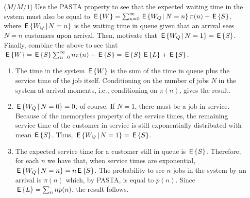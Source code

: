 \begin{comment}
\begin{exercise}[use=false]
  As a challenge you can try to derive \eqref{eq:24} by means of sample path arguments.
  \begin{solution}
    \TBD
  \end{solution}
\end{exercise}
\end{comment}




\begin{exercise}($M/M/1$)
  Use the PASTA property to see that the expected waiting time in the
  system must also be equal to
  $\,\mathsf{E}\left\{W\right\} = \sum_{n=0}^\infty \,\mathsf{E}\left\{W_Q \,\middle|\, N=n\right\} \pi(n) + \,\mathsf{E}\left\{S\right\}$, 
where $\,\mathsf{E}\left\{W_Q \,\middle|\, N=n\right\}$ is the waiting time in queue given that an
arrival sees $N=n$ customers upon arrival. Then, 
 motivate that $\,\mathsf{E}\left\{W_Q \,\middle|\, N=1\right\} = \,\mathsf{E}\left\{S\right\}$. Finally, combine the above to see that 
$\,\mathsf{E}\left\{W\right\} = \,\mathsf{E}\left\{S\right\} \sum_{n=0}^\infty n \pi(n) + \,\mathsf{E}\left\{S\right\} = \,\mathsf{E}\left\{S\right\} \,\mathsf{E}\left\{L\right\} + \,\mathsf{E}\left\{S\right\}$.
  \begin{solution}
    \begin{enumerate}
    \item The time in the system $\,\mathsf{E}\left\{W\right\}$ is the sum of the time in
      queue plus the service time of the job itself.  Conditioning on
      the number of jobs $N$ in the system at arrival moments, i.e.,
      conditioning on $\pi(n)$, gives the result.  
    \item $\,\mathsf{E}\left\{W_Q\,\middle|\, N=0\right\}=0$, of course. If $N=1$, there must be a job
      in service.  Because of the memoryless property of the service
      times, the remaining service time of the customer in service is
      still exponentially distributed with mean $\,\mathsf{E}\left\{S\right\}$. Thus,
      $\,\mathsf{E}\left\{W_Q\,\middle|\, N=1\right\}=\,\mathsf{E}\left\{S\right\}$. 
    \item The expected service time for a customer still in queue is
      $\,\mathsf{E}\left\{S\right\}$.  Therefore, for each $n$ we have that, when service
      times are exponential, $\,\mathsf{E}\left\{W_Q\,\middle|\, N=n\right\}= n \,\mathsf{E}\left\{S\right\}$. The probability
      to see $n$ jobs in the system by an arrival is $\pi(n)$ which,
      by PASTA, is equal to $p(n)$. Since $\,\mathsf{E}\left\{L\right\} = \sum_n n p(n)$, the
      result follows.
    \end{enumerate}
  \end{solution}
\end{exercise}

